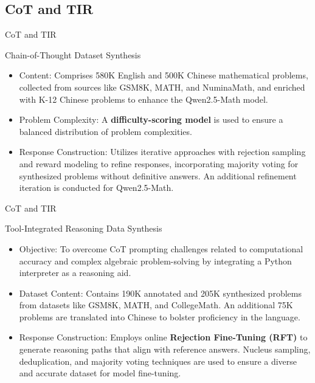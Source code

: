 \documentclass[aspectratio=169]{beamer}
\begin{document}
\subsection{CoT and TIR}
\begin{frame}{CoT and TIR}
    \begin{exampleblock}{Chain-of-Thought Dataset Synthesis}
        \begin{itemize}
            \item Content: Comprises 580K English and 500K Chinese mathematical problems, collected from sources like GSM8K, MATH, and NuminaMath, and enriched with K-12 Chinese problems to enhance the Qwen2.5-Math model.
            \pause
\item Problem Complexity: A \textbf{difficulty-scoring model} is used to ensure a balanced distribution of problem complexities.
\pause
\item Response Construction: Utilizes iterative approaches with rejection sampling and reward modeling to refine responses, incorporating majority voting for synthesized problems without definitive answers. An additional refinement iteration is conducted for Qwen2.5-Math.
        \end{itemize}    
    \end{exampleblock}
\end{frame}

\begin{frame}{CoT and TIR}
    \begin{exampleblock}{Tool-Integrated Reasoning Data Synthesis}
        \begin{itemize}
            \item Objective: To overcome CoT prompting challenges related to computational accuracy and complex algebraic problem-solving by integrating a Python interpreter as a reasoning aid.
            \pause
            \item Dataset Content: Contains 190K annotated and 205K synthesized problems from datasets like GSM8K, MATH, and CollegeMath. An additional 75K problems are translated into Chinese to bolster proficiency in the language.
            \pause
            \item Response Construction: Employs online \textbf{Rejection Fine-Tuning (RFT)} to generate reasoning paths that align with reference answers. Nucleus sampling, deduplication, and majority voting techniques are used to ensure a diverse and accurate dataset for model fine-tuning.
        \end{itemize}
    \end{exampleblock}
\end{frame}
\end{document}
